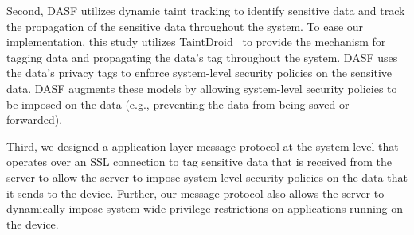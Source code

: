 Second, DASF utilizes dynamic taint tracking to identify sensitive
data and track the propagation of the sensitive data throughout
the system. To ease our implementation, this study utilizes
TaintDroid~\cite{taintdroid} to provide
the mechanism for tagging data and propagating the data's tag
throughout the system.  
DASF uses the data's privacy
tags to enforce system-level security policies on the sensitive
data.  DASF augments these models by allowing
system-level security policies to be imposed on the data
(e.g., preventing the data from being saved or forwarded).

Third, we designed a application-layer message protocol at the
system-level that operates over an SSL connection to tag sensitive
data that is received from the server to allow the server to
impose system-level security policies on the data that it sends
to the device.  Further, our message protocol also allows the
server to dynamically impose system-wide privilege restrictions
on applications running on the device.


